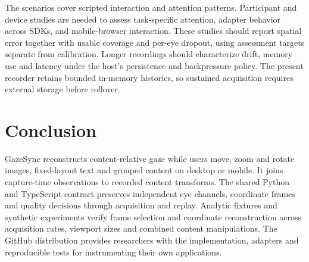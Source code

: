 \documentclass[sigconf,screen,nonacm]{acmart}
\begin{document}
The scenarios cover scripted interaction and attention patterns. Participant and
device studies are needed to assess task-specific attention, adapter behavior
across SDKs, and mobile-browser interaction. These studies should report spatial
error together with usable coverage and per-eye dropout, using assessment targets
separate from calibration. Longer recordings should characterize drift, memory
use and latency under the host's persistence and backpressure policy. The present
recorder retains bounded in-memory histories, so sustained acquisition requires
external storage before rollover.

\section{Conclusion}
GazeSync reconstructs content-relative gaze while users move, zoom and rotate
images, fixed-layout text and grouped content on desktop or mobile. It joins
capture-time observations to recorded content transforms. The shared
Python and TypeScript contract preserves independent eye channels, coordinate
frames and quality decisions through acquisition and replay. Analytic fixtures
and synthetic experiments verify frame selection and coordinate reconstruction
across acquisition rates, viewport sizes and combined content manipulations.
The GitHub distribution provides
researchers with the implementation, adapters and reproducible tests for
instrumenting their own applications.
\end{document}
